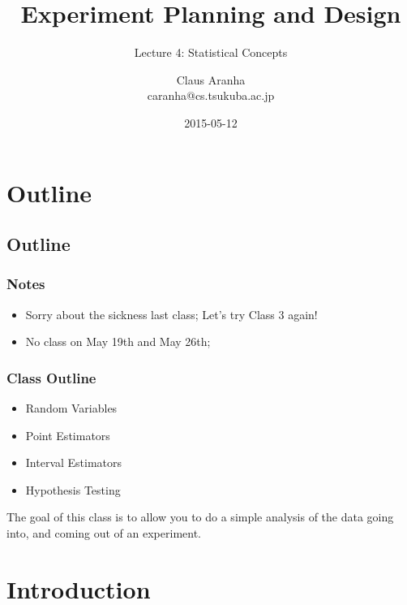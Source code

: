 \documentclass[10pt]{beamer}
\title[]{Experiment Planning and Design}
\subtitle[]{Lecture 4: Statistical Concepts}
\author[Claus Aranha]{Claus Aranha\\{\footnotesize caranha@cs.tsukuba.ac.jp}}
\institute{Department of Computer Science}
\date{2015-05-12}
\begin{document}
\section{Outline}
\subsection{Outline}

\begin{frame}
  \maketitle
\end{frame}

\begin{frame}
  \frametitle{Notes} 
  \begin{itemize}
  \item Sorry about the sickness last class; Let's try Class 3 again!

    \bigskip

  \item No class on May 19th and May 26th;
  \end{itemize}
\end{frame}

\begin{frame}
  \frametitle{Class Outline}
  \begin{itemize}
  \item Random Variables
  \item Point Estimators
  \item Interval Estimators
  \item Hypothesis Testing
  \end{itemize}
  \begin{exampleblock}{}
    The goal of this class is to allow you to do a simple analysis of
    the data going into, and coming out of an experiment.
  \end{exampleblock}
\end{frame}

\section{Introduction}
\end{document}
